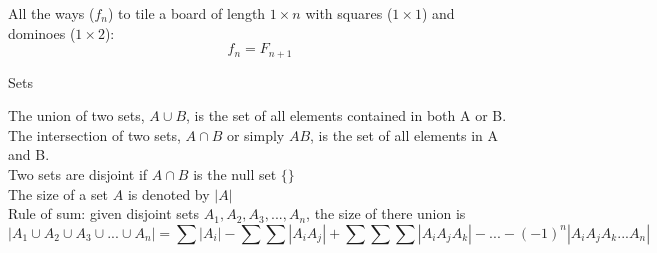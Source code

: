 \documentclass[12pt]{article}
\begin{document}
\noindent All the ways ($f_n$) to tile a board of length $1 \times n$ with squares ($1 \times 1$) and dominoes ($1 \times 2$):
\[ f_n = F_{n+1}\]

\pagebreak

\begin{center} Sets \end{center}

\noindent The union of two sets, $A \cup B$, is the set of all elements contained in both A or B.\\

\noindent The intersection of two sets, $A \cap B$ or simply $AB$, is the set of all elements in A and B.\\

\noindent Two sets are disjoint if $A \cap B $ is the null set $\{\}$\\

\noindent The size of a set $A$ is denoted by $|A|$\\

\noindent Rule of sum: given disjoint sets $A_1, A_2, A_3, ..., A_n$, the size of there union is
\[|A_1 \cup A_2 \cup A_3 \cup ... \cup A_n| = \sum{|A_i|} -  \sum \sum{|A_iA_j|} + \sum \sum \sum{|A_iA_jA_k|} - ... - (-1)^n |A_iA_jA_k...A_n|\]
\end{document}
